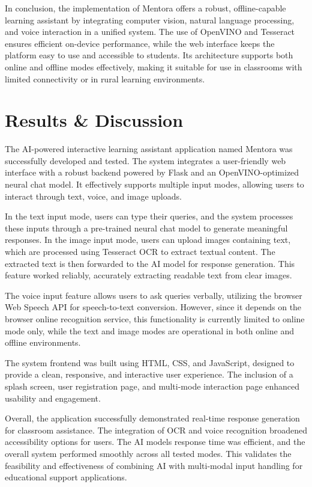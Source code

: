 \documentclass{josis}
\begin{document}
In conclusion, the implementation of Mentora offers a robust, offline-capable learning assistant by integrating computer vision, natural language processing, and voice interaction in a unified system. The use of OpenVINO and Tesseract ensures efficient on-device performance, while the web interface keeps the platform easy to use and accessible to students. Its architecture supports both online and offline modes effectively, making it suitable for use in classrooms with limited connectivity or in rural learning environments.

 
\section{Results \& Discussion}
The AI-powered interactive learning assistant application named Mentora was successfully developed and tested. The system integrates a user-friendly web interface with a robust backend powered by Flask and an OpenVINO-optimized neural chat model. It effectively supports multiple input modes, allowing users to interact through text, voice, and image uploads.

In the text input mode, users can type their queries, and the system processes these inputs through a pre-trained neural chat model to generate meaningful responses. In the image input mode, users can upload images containing text, which are processed using Tesseract OCR to extract textual content. The extracted text is then forwarded to the AI model for response generation. This feature worked reliably, accurately extracting readable text from clear images.

The voice input feature allows users to ask queries verbally, utilizing the browser Web Speech API for speech-to-text conversion. However, since it depends on the browser online recognition service, this functionality is currently limited to online mode only, while the text and image modes are operational in both online and offline environments.

The system frontend was built using HTML, CSS, and JavaScript, designed to provide a clean, responsive, and interactive user experience. The inclusion of a splash screen, user registration page, and multi-mode interaction page enhanced usability and engagement.

Overall, the application successfully demonstrated real-time response generation for classroom assistance. The integration of OCR and voice recognition broadened accessibility options for users. The AI models response time was efficient, and the overall system performed smoothly across all tested modes. This validates the feasibility and effectiveness of combining AI with multi-modal input handling for educational support applications.
\end{document}

